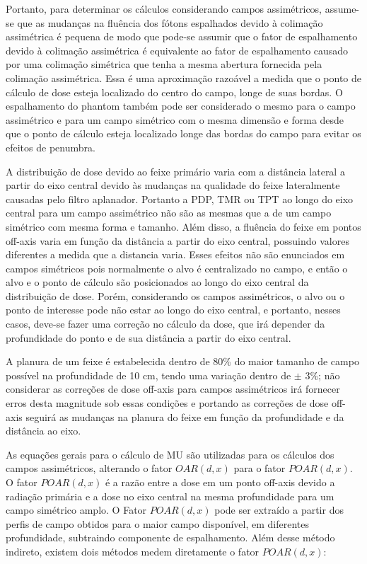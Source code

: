\documentclass[11pt,a4paper]{article}
\begin{document}
        Portanto, para determinar os cálculos considerando campos assimétricos, assume-se que as mudanças na fluência dos fótons espalhados devido à colimação assimétrica é pequena de modo que pode-se assumir que o fator de espalhamento devido à colimação assimétrica é equivalente ao fator de espalhamento causado por uma colimação simétrica que tenha a mesma abertura fornecida pela colimação assimétrica. Essa é uma aproximação razoável a medida que o ponto de cálculo de dose esteja localizado do centro do campo, longe de suas bordas. O espalhamento do phantom também pode ser considerado o mesmo para o campo assimétrico e para um campo simétrico com o mesma dimensão e forma desde que o ponto de cálculo esteja localizado longe das bordas do campo para evitar os efeitos de penumbra. 

        A distribuição de dose devido ao feixe primário varia com a distância lateral a partir do eixo central devido às mudanças na qualidade do feixe lateralmente causadas pelo filtro aplanador. Portanto a PDP, TMR ou TPT ao longo do eixo central para um campo assimétrico não são as mesmas que a de um campo simétrico com mesma forma e tamanho. Além disso, a fluência do feixe em pontos off-axis varia em função da distância a partir do eixo central, possuindo valores diferentes a medida que a distancia varia. Esses efeitos não são enunciados em campos simétricos pois normalmente o alvo é centralizado no campo, e então o alvo e o ponto de cálculo são posicionados ao longo do eixo central da distribuição de dose. Porém, considerando os campos assimétricos, o alvo ou o ponto de interesse pode não estar ao longo do eixo central, e portanto, nesses casos, deve-se fazer uma correção no cálculo da dose, que irá depender da profundidade do ponto e de sua distância a partir do eixo central.

        A planura de um feixe é estabelecida dentro de 80\% do maior tamanho de campo possível na profundidade de 10 cm, tendo uma variação dentro de $\pm$ 3\%; não considerar as correções de dose off-axis para campos assimétricos irá fornecer erros desta magnitude sob essas condições e portando as correções de dose off-axis seguirá as mudanças na planura do feixe em função da profundidade e da distância ao eixo.


        As equações gerais para o cálculo de MU são utilizadas para os cálculos dos campos assimétricos, alterando o fator $OAR(d, x)$ para o fator $POAR(d, x)$. O fator $POAR(d, x)$ é a razão entre a dose em um ponto off-axis devido a radiação primária e a dose no eixo central na mesma profundidade para um campo simétrico amplo. O Fator $POAR(d, x)$ pode ser extraído a partir dos perfis de campo obtidos para o maior campo disponível, em diferentes profundidade, subtraindo componente de espalhamento. Além desse método indireto, existem dois métodos medem diretamente o fator $POAR(d, x)$:
\end{document}
